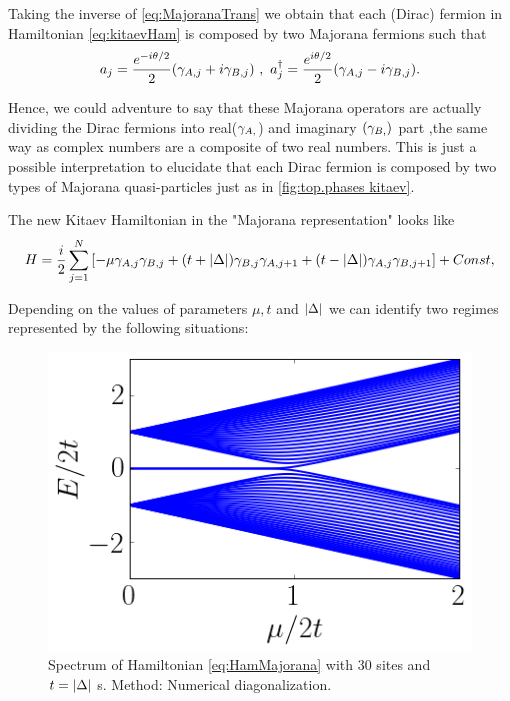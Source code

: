 Taking the inverse of \eqref{eq:MajoranaTrans} we obtain that each  (Dirac) fermion in Hamiltonian \eqref{eq:kitaevHam} is composed by two Majorana fermions such that 
\begin{equation}
a_j = \frac{e^{-i\theta/2}}{2}(\gamma_{A,j}+ i\gamma_{B,j}) \ ,\ a^\dagger_j = \frac{e^{i\theta/2}}{2}(\gamma_{A,j}- i\gamma_{B,j}).
\end{equation}

\noindent Hence, we could adventure to say that these Majorana operators are actually dividing the Dirac fermions into real($\gamma_{A,}$) and imaginary $(\gamma_{B,})$ part ,the same way as complex numbers are a composite of two real numbers. This is just a possible interpretation to elucidate that each Dirac fermion is composed by two types of Majorana quasi-particles just as in \ref{fig:top.phases kitaev}. 

The new Kitaev Hamiltonian in the "Majorana representation" looks like 
\begin{equation}
H = \frac{i}{2} \sum_{j=1}^N \left[ -\mu \gamma_{A,j}\gamma_{B,j}  + (t+ \vert \Delta \vert) \gamma_{B,j}\gamma_{A,j+1} + (t- \vert \Delta \vert) \gamma_{A,j}\gamma_{B,j+1} \right]+Const,\label{eq:HamMajorana}
\end{equation}

Depending on the values of parameters $\mu, t$ and $\vert \Delta \vert$ we can identify two regimes represented by the following situations:





\begin{figure}[t]
    \centering
    \includegraphics[scale=0.65]{IMAGES/Majorana/Spectrum.png}
    \caption{ \label{fig:KitaevSpec} Spectrum of Hamiltonian \ref{eq:HamMajorana} with $30$ sites and $t=\vert \Delta \vert$ s. Method: Numerical diagonalization. \protect {} }
\end{figure}


